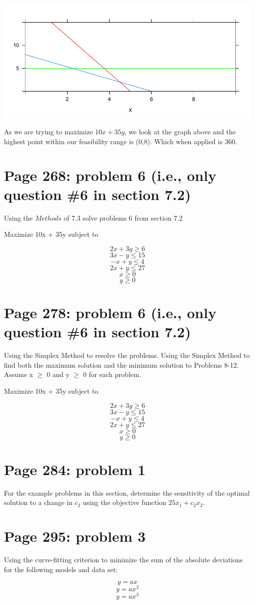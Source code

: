\documentclass[]{article}
\begin{document}
\includegraphics{Christophe_Hunt_hw6_files/figure-latex/unnamed-chunk-3-1.pdf}

As we are trying to maximize \(10x + 35y\), we look at the graph above
and the highest point within our feasibility range is (0,8). Which when
applied is 360.

\section{Page 268: problem 6 (i.e., only question \#6 in section
7.2)}\label{page-268-problem-6-i.e.-only-question-6-in-section-7.2}

Using the \(Methods\) of 7.3 solve problems 6 from section 7.2

Maximize 10x + 35y subject to

\[2x + 3y \geq 6\] \[3x - y \leq 15\] \[-x + y \leq 4\]
\[2x + y \leq 27\] \[x \geq 0\] \[y \geq 0\]

\section{Page 278: problem 6 (i.e., only question \#6 in section
7.2)}\label{page-278-problem-6-i.e.-only-question-6-in-section-7.2}

Using the Simplex Method to resolve the problems. Using the Simplex
Method to find both the maximum solution and the minimum solution to
Problems 8-12. Assume x \(\geq\) 0 and y \(\geq\) 0 for each problem.

Maximize 10x + 35y subject to

\[2x + 3y \geq 6\] \[3x - y \leq 15\] \[-x + y \leq 4\]
\[2x + y \leq 27\] \[x \geq 0\] \[y \geq 0\]

\section{Page 284: problem 1}\label{page-284-problem-1}

For the example problems in this section, determine the sensitivity of
the optimal solution to a change in \(c_2\) using the objective function
\(25x_1 + c_2x_2\).

\section{Page 295: problem 3}\label{page-295-problem-3}

Using the curve-fitting criterion to minimize the sum of the absolute
deviations for the following models and data set:

\[y = ax\] \[y = ax^2\] \[y = ax^3\]
\end{document}
